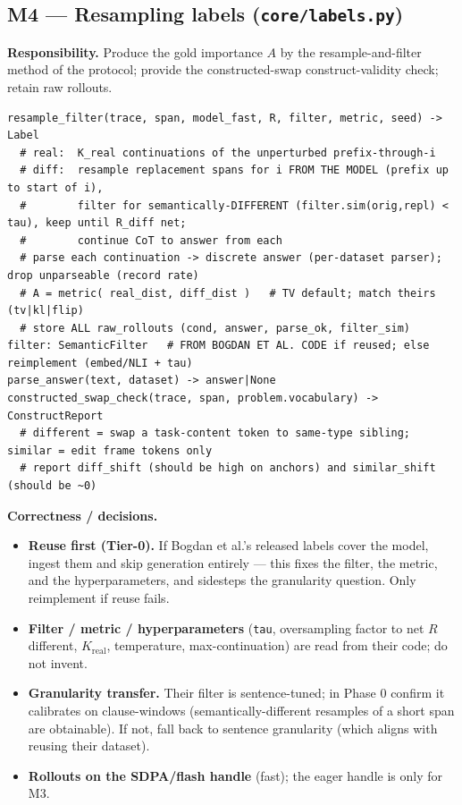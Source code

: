 \documentclass[11pt]{article}
\begin{document}
\subsection{M4 --- Resampling labels (\texttt{core/labels.py})}
\textbf{Responsibility.} Produce the gold importance $A$ by the resample-and-filter method of the
protocol; provide the constructed-swap construct-validity check; retain raw rollouts.
\begin{lstlisting}
resample_filter(trace, span, model_fast, R, filter, metric, seed) -> Label
  # real:  K_real continuations of the unperturbed prefix-through-i
  # diff:  resample replacement spans for i FROM THE MODEL (prefix up to start of i),
  #        filter for semantically-DIFFERENT (filter.sim(orig,repl) < tau), keep until R_diff net;
  #        continue CoT to answer from each
  # parse each continuation -> discrete answer (per-dataset parser); drop unparseable (record rate)
  # A = metric( real_dist, diff_dist )   # TV default; match theirs (tv|kl|flip)
  # store ALL raw_rollouts (cond, answer, parse_ok, filter_sim)
filter: SemanticFilter   # FROM BOGDAN ET AL. CODE if reused; else reimplement (embed/NLI + tau)
parse_answer(text, dataset) -> answer|None
constructed_swap_check(trace, span, problem.vocabulary) -> ConstructReport
  # different = swap a task-content token to same-type sibling; similar = edit frame tokens only
  # report diff_shift (should be high on anchors) and similar_shift (should be ~0)
\end{lstlisting}
\textbf{Correctness / decisions.}
\begin{itemize}
\item \textbf{Reuse first (Tier-0).} If Bogdan et al.'s released labels cover the model, ingest them and
skip generation entirely --- this fixes the filter, the metric, and the hyperparameters, and sidesteps
the granularity question. Only reimplement if reuse fails.
\item \textbf{Filter / metric / hyperparameters} (\texttt{tau}, oversampling factor to net $R$ different,
$K_{\text{real}}$, temperature, max-continuation) are read from their code; do not invent.
\item \textbf{Granularity transfer.} Their filter is sentence-tuned; in Phase 0 confirm it calibrates on
clause-windows (semantically-different resamples of a short span are obtainable). If not, fall back to
sentence granularity (which aligns with reusing their dataset).
\item \textbf{Rollouts on the SDPA/flash handle} (fast); the eager handle is only for M3.
\end{itemize}
\end{document}
